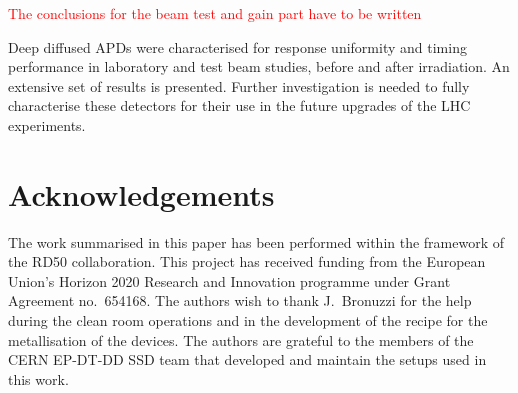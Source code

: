 \documentclass{article}
\begin{document}

\textcolor{red}{The conclusions for the beam test and gain part have to be written}

Deep diffused APDs were characterised for response uniformity and timing performance in laboratory and test beam studies, before and after irradiation.
An extensive set of results is presented.
Further investigation is needed to fully characterise these detectors for their use in the future upgrades of the LHC experiments.

\section*{Acknowledgements}

The work summarised in this paper has been performed within the framework of the RD50 collaboration.
This project has received funding from the European Union’s Horizon 2020 Research and Innovation programme under Grant Agreement no.\ 654168.
The authors wish to thank J.~Bronuzzi for the help during the clean room operations and in the development of the recipe for the metallisation of the devices.
The authors are grateful to the members of the CERN EP-DT-DD SSD team that developed and maintain the setups used in this work.


%

\end{document}
